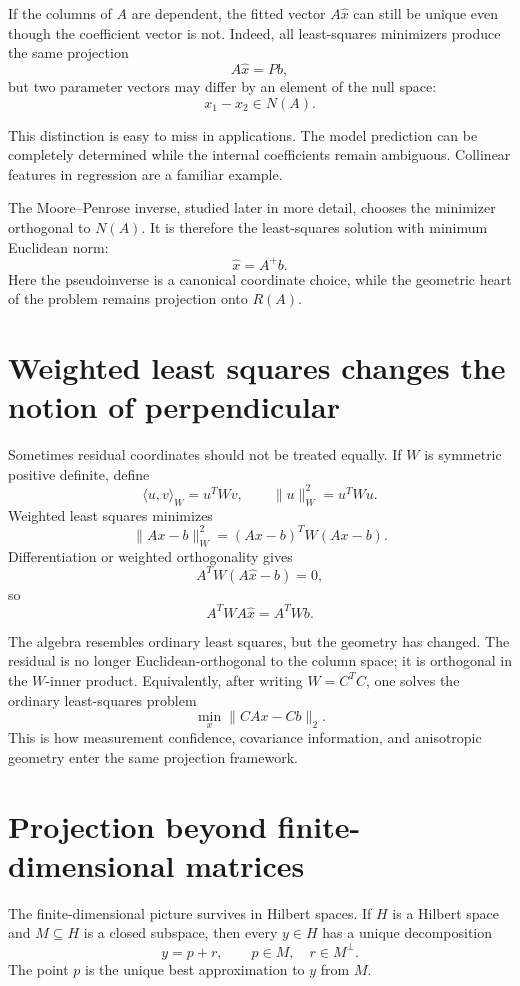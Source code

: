 If the columns of \(A\) are dependent, the fitted vector \(A\widehat x\) can still be unique even though the coefficient vector is not.  Indeed, all least-squares minimizers produce the same projection
\[
  A\widehat x=Pb,
\]
but two parameter vectors may differ by an element of the null space:
\[
  x_1-x_2\in N(A).
\]

This distinction is easy to miss in applications.  The model prediction can be completely determined while the internal coefficients remain ambiguous.  Collinear features in regression are a familiar example.

The Moore--Penrose inverse, studied later in more detail, chooses the minimizer orthogonal to \(N(A)\).  It is therefore the least-squares solution with minimum Euclidean norm:
\[
  \widehat x=A^+b.
\]
Here the pseudoinverse is a canonical coordinate choice, while the geometric heart of the problem remains projection onto \(R(A)\).

\section{Weighted least squares changes the notion of perpendicular}

Sometimes residual coordinates should not be treated equally.  If \(W\) is symmetric positive definite, define
\[
  \langle u,v\rangle_W=u^TWv,
  \qquad
  \|u\|_W^2=u^TWu.
\]
Weighted least squares minimizes
\[
  \|Ax-b\|_W^2=(Ax-b)^TW(Ax-b).
\]
Differentiation or weighted orthogonality gives
\[
  A^TW(A\widehat x-b)=0,
\]
so
\[
  A^TWA\widehat x=A^TWb.
\]

The algebra resembles ordinary least squares, but the geometry has changed.  The residual is no longer Euclidean-orthogonal to the column space; it is orthogonal in the \(W\)-inner product.  Equivalently, after writing \(W=C^TC\), one solves the ordinary least-squares problem
\[
  \min_x\|CAx-Cb\|_2.
\]
This is how measurement confidence, covariance information, and anisotropic geometry enter the same projection framework.

\section{Projection beyond finite-dimensional matrices}

The finite-dimensional picture survives in Hilbert spaces.  If \(H\) is a Hilbert space and \(M\subseteq H\) is a closed subspace, then every \(y\in H\) has a unique decomposition
\[
  y=p+r,
  \qquad
  p\in M,\quad r\in M^\perp.
\]
The point \(p\) is the unique best approximation to \(y\) from \(M\).

